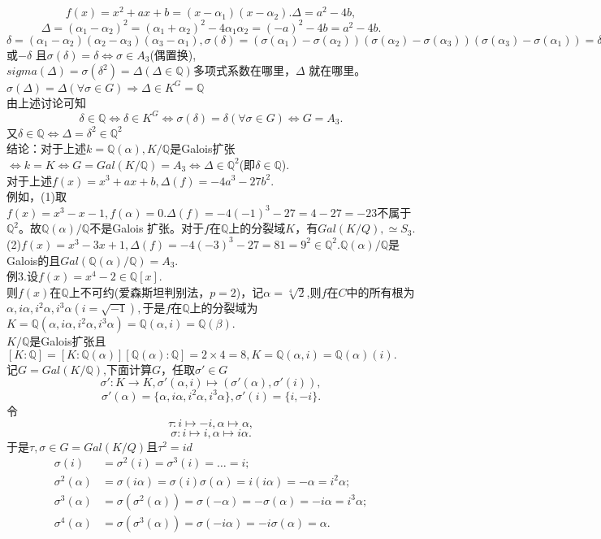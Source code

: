 \documentclass[UTF8]{article}
\begin{document}
$$f(x)=x^2+ax+b=(x-\alpha_1)(x-\alpha_2).\Delta=a^2-4b,$$
$$\Delta=(\alpha_1-\alpha_2)^2=(\alpha_1+\alpha_2)^2-4\alpha_1\alpha_2=(-a)^2-4b=a^2-4b.$$
$\delta=(\alpha_1-\alpha_2)(\alpha_2-\alpha_3)(\alpha_3-\alpha_1),\sigma(\delta)=(\sigma(\alpha_1)-\sigma(\alpha_2))(\sigma(\alpha_2)-\sigma(\alpha_3))(\sigma(\alpha_3)-\sigma(\alpha_1))=\delta$ 或$-\delta$ 且$\sigma(\delta)=\delta\Leftrightarrow \sigma\in A_3$(偶置换),\\$sigma(\Delta)=\sigma(\delta^2)=\Delta(\Delta\in \mathbb{Q})$多项式系数在哪里，$\Delta$ 就在哪里。\\
$\sigma(\Delta)=\Delta(\forall\sigma\in G)\Rightarrow \Delta \in K^G=\mathbb{Q}$\\
由上述讨论可知
$$\delta\in \mathbb{Q}\Leftrightarrow\delta\in K^G\Leftrightarrow\sigma(\delta)=\delta(\forall\sigma\in G)\Leftrightarrow G=A_3.$$
又$\delta\in \mathbb{Q}\Leftrightarrow\Delta=\delta^2\in \mathbb{Q}^2$\\
结论：对于上述$k=\mathbb{Q}(\alpha),K/\mathbb{Q}$是Galois扩张$\Leftrightarrow k=K\Leftrightarrow G=Gal(K/\mathbb{Q})=A_3\Leftrightarrow\Delta\in \mathbb{Q}^2$(即$\delta\in \mathbb{Q}$).\\
对于上述$f(x)=x^3+ax+b,\Delta(f)=-4a^3-27b^2.$\\
例如，(1)取$f(x)=x^3-x-1,f(\alpha)=0.\Delta(f)=-4(-1)^3-27=4-27=-23$不属于$\mathbb{Q}^2$。故$\mathbb{Q}(\alpha)/\mathbb{Q}$不是Galois 扩张。对于$f$在$\mathbb{Q}$上的分裂域$K$，有$Gal(K/Q),\simeq S_3.$\\
(2)$f(x)=x^3-3x+1,\Delta(f)=-4(-3)^3-27=81=9^2\in \mathbb{Q}^2.\mathbb{Q}(\alpha)/\mathbb{Q}$是Galois的且$Gal(\mathbb{Q}(\alpha)/\mathbb{Q})=A_3.$\\
例3.设$f(x)=x^4-2\in \mathbb{Q}[x].$\\
则$f(x)$在$\mathbb{Q}$上不可约(爱森斯坦判别法，$p=2$)，记$\alpha=\sqrt[4]{2}$,则$f$在$C$中的所有根为
$\alpha,i\alpha,i^2\alpha,i^3\alpha(i=\sqrt{-1}),$于是$f$在$\mathbb{Q}$上的分裂域为$K=\mathbb{Q}(\alpha,i\alpha,i^2\alpha,i^3\alpha)=\mathbb{Q}(\alpha,i)=\mathbb{Q}(\beta).$\\
$K/\mathbb{Q}$是Galois扩张且$[K:\mathbb{Q}]=[K:\mathbb{Q}(\alpha)][\mathbb{Q}(\alpha):\mathbb{Q}]=2\times4=8,K=\mathbb{Q}(\alpha,i)=\mathbb{Q}(\alpha)(i).$\\
记$G=Gal(K/\mathbb{Q})$,下面计算$G$，任取$\sigma'\in G$\\
$$\sigma':K\longrightarrow K,\sigma'(\alpha,i)\longmapsto(\sigma'(\alpha),\sigma'(i)),$$
$$
\sigma'(\alpha)=\{\alpha,i\alpha,i^2\alpha,i^3\alpha\},\sigma'(i)=\{i,-i\}.$$
令
$$\tau:i\longmapsto -i,\alpha\longmapsto \alpha,$$
$$
\sigma:i\longmapsto i,\alpha\longmapsto i\alpha.$$
于是$\tau,\sigma \in G=Gal(K/Q)$且$\tau^2=id$\\
\[
\begin{split}
\sigma(i)&=\sigma^2(i)=\sigma^3(i)=\ldots=i;\\
\sigma^2(\alpha)&=\sigma(i\alpha)=\sigma(i)\sigma(\alpha)=i(i\alpha)=-\alpha=i^2\alpha;\\
\sigma^3(\alpha)&=\sigma(\sigma^2(\alpha))=\sigma(-\alpha)=-\sigma(\alpha)=-i\alpha=i^3\alpha;\\
\sigma^4(\alpha)&=\sigma(\sigma^3(\alpha))=\sigma(-i\alpha)=-i\sigma(\alpha)=\alpha.
\end{split}
\]
\end{document}
